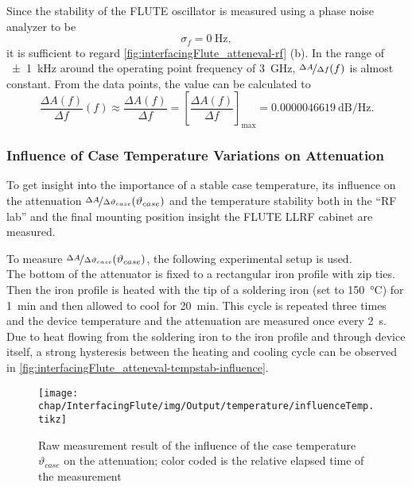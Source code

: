 Since the stability of the FLUTE oscillator is measured using a phase noise analyzer to be
\begin{equation}
\sigma_f = \SI{0}{\hertz},
\end{equation}
it is sufficient to regard \autoref{fig:interfacingFlute_atteneval-rf} (b). In the range of \SI{\pm1}{\kHz} around the operating point frequency of \SI{3}{\GHz}, $\nicefrac{\Delta A}{\Delta f} (f)$ is almost constant. From the data points, the value can be calculated to
\begin{equation}
\frac{\Delta A(f)}{\Delta f}(f) 
\approx \frac{\Delta A(f)}{\Delta f} 
= \left[\frac{\Delta A(f)}{\Delta f}\right]_\text{max}
=\SI{0.0000046619}{\dB\per\hertz}.
\end{equation}

\subsubsection{Influence of Case Temperature Variations on Attenuation}
To get insight into the importance of a stable case temperature, its influence on the attenuation $\nicefrac{\Delta A}{\Delta \vartheta_{case}} (\vartheta_{case})$ and the temperature stability both in the ``RF lab'' and the final mounting position insight the FLUTE LLRF cabinet are measured.

To measure $\nicefrac{\Delta A}{\Delta \vartheta_{case}} (\vartheta_{case})$, the following experimental setup is used.\\
The bottom of the attenuator is fixed to a rectangular iron profile with zip ties. Then the iron profile is heated with the tip of a soldering iron (set to \SI{150}{\degreeCelsius}) for \SI{1}{\minute} and then allowed to cool for \SI{20}{\minute}. This cycle is repeated three times and the device temperature and the attenuation are measured once every \SI{2}{\second}. Due to heat flowing from the soldering iron to the iron profile and through device itself, a strong hysteresis between the heating and cooling cycle can be observed in \autoref{fig:interfacingFlute_atteneval-tempstab-influence}.

\begin{figure}[tb]
	\centering
	\texttt{[image: chap/InterfacingFlute/img/Output/temperature/influenceTemp.tikz]}
	\caption{Raw measurement result of the influence of the case temperature $\vartheta_{case}$ on the attenuation; color coded is the relative elapsed time of the measurement}
	\label{fig:interfacingFlute_atteneval-tempstab-influence}
\end{figure}

